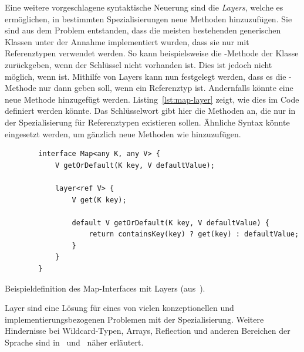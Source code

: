 Eine weitere vorgeschlagene syntaktische Neuerung sind die \emph{Layers}, welche es ermöglichen, in bestimmten Spezialisierungen neue Methoden hinzuzufügen.
Sie sind aus dem Problem entstanden, dass die meisten bestehenden generischen Klassen unter der Annahme implementiert wurden, dass sie nur mit Referenztypen verwendet werden.
So kann beispielsweise die -Methode der Klasse   zurückgeben, wenn der Schlüssel nicht vorhanden ist.
Dies ist jedoch nicht möglich, wenn  ist.
Mithilfe von Layers kann nun festgelegt werden, dass es die -Methode nur dann geben soll, wenn  ein Referenztyp ist.
Andernfalls könnte eine neue Methode  hinzugefügt werden.
Listing~\ref{lst:map-layer} zeigt, wie dies im Code definiert werden könnte.
Das Schlüsselwort  gibt hier die Methoden an, die nur in der Spezialisierung für Referenztypen  existieren sollen.
Ähnliche Syntax könnte eingesetzt werden, um gänzlich neue Methoden wie  hinzuzufügen.

\begin{listing}
    \begin{verbatim}
        interface Map<any K, any V> {
            V getOrDefault(K key, V defaultValue);

            layer<ref V> {
                V get(K key);

                default V getOrDefault(K key, V defaultValue) {
                    return containsKey(key) ? get(key) : defaultValue;
                }
            }
        }
    \end{verbatim}
    \caption{Beispieldefinition des Map-Interfaces mit Layers (aus~\cite{specialization}).}
    \label{lst:map-layer}
\end{listing}

Layer sind eine Lösung für eines von vielen konzeptionellen und implementierungsbezogenen Problemen mit der Spezialisierung.
Weitere Hindernisse bei Wildcard-Typen, Arrays, Reflection und anderen Bereichen der Sprache sind in~\cite{jep-218} und~\cite{specialization} näher erläutert.
